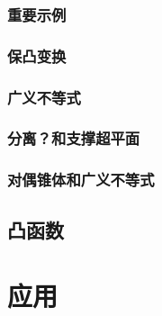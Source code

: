 \documentclass[12pt,a4paper]{book}
\begin{document}
\section{重要示例}
\section{保凸变换}
\section{广义不等式}
\section{分离？和支撑超平面}
\section{对偶锥体和广义不等式}

\chapter{凸函数}

\part{应用}




\printindex
\end{document}
